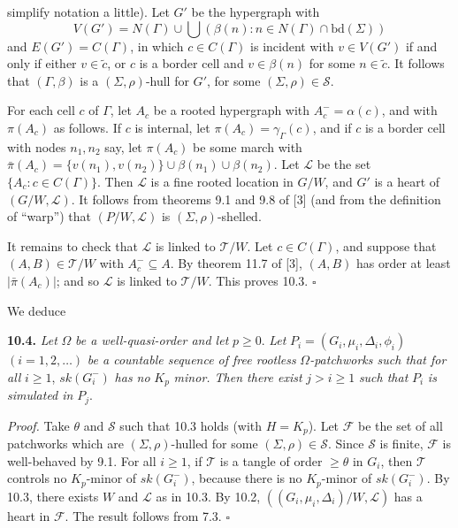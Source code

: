 \noindent simplify notation a little). Let $G'$ be the hypergraph with
\begin{equation*}
V(G') = N(\Gamma) \cup \bigcup(\beta(n) : n \in N(\Gamma) \cap \text{bd}(\Sigma))
\end{equation*}
and $E(G') = C(\Gamma)$, in which $c \in C(\Gamma)$ is incident with $v \in V(G')$ if and only if either $v \in \tilde{c}$, or $c$ is a border cell and $v \in \beta(n)$ for some $n \in \tilde{c}$. It follows that $(\Gamma, \beta)$ is a $(\Sigma, \rho)$-hull for $G'$, for some $(\Sigma, \rho) \in \mathcal{S}$.

For each cell $c$ of $\Gamma$, let $A_c$ be a rooted hypergraph with $A_c^- = \alpha(c)$, and with $\pi(A_c)$ as follows. If $c$ is internal, let $\pi(A_c) = \gamma_\Gamma(c)$, and if $c$ is a border cell with nodes $n_1, n_2$ say, let $\pi(A_c)$ be some march with $\bar{\pi}(A_c) = \{v(n_1), v(n_2)\} \cup \beta(n_1) \cup \beta(n_2)$. Let $\mathcal{L}$ be the set $\{A_c : c \in C(\Gamma)\}$. Then $\mathcal{L}$ is a fine rooted location in $G/W$, and $G'$ is a heart of $(G/W, \mathcal{L})$. It follows from theorems 9.1 and 9.8 of [3] (and from the definition of ``warp'') that $(P/W, \mathcal{L})$ is $(\Sigma, \rho)$-shelled.

It remains to check that $\mathcal{L}$ is linked to $\mathcal{T}/W$. Let $c \in C(\Gamma)$, and suppose that $(A, B) \in \mathcal{T}/W$ with $A_c^- \subseteq A$. By theorem 11.7 of [3], $(A, B)$ has order at least $|\bar{\pi}(A_c)|$; and so $\mathcal{L}$ is linked to $\mathcal{T}/W$. This proves 10.3. $\square$

We deduce

\textbf{10.4.} \textit{Let} $\Omega$ \textit{be a well-quasi-order and let} $p \ge 0$. \textit{Let} $P_i = (G_i, \mu_i, \Delta_i, \phi_i)$ $(i = 1, 2, \dots)$ \textit{be a countable sequence of free rootless} $\Omega$\textit{-patchworks such that for all} $i \ge 1$, $sk(G_i^-)$ \textit{has no} $K_p$ \textit{minor. Then there exist} $j > i \ge 1$ \textit{such that} $P_i$ \textit{is simulated in} $P_j$.

\textit{Proof.} Take $\theta$ and $\mathcal{S}$ such that 10.3 holds (with $H = K_p$). Let $\mathcal{F}$ be the set of all patchworks which are $(\Sigma, \rho)$-hulled for some $(\Sigma, \rho) \in \mathcal{S}$. Since $\mathcal{S}$ is finite, $\mathcal{F}$ is well-behaved by 9.1. For all $i \ge 1$, if $\mathcal{T}$ is a tangle of order $\ge \theta$ in $G_i$, then $\mathcal{T}$ controls no $K_p$-minor of $sk(G_i^-)$, because there is no $K_p$-minor of $sk(G_i^-)$. By 10.3, there exists $W$ and $\mathcal{L}$ as in 10.3. By 10.2, $((G_i, \mu_i, \Delta_i)/W, \mathcal{L})$ has a heart in $\mathcal{F}$. The result follows from 7.3. $\square$

